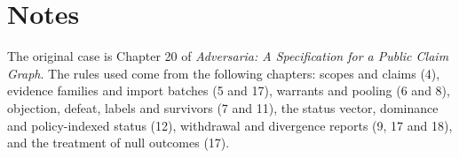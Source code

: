 \documentclass[11pt]{article}
\begin{document}
\section*{Notes}

The original case is Chapter 20 of \emph{Adversaria: A Specification for a Public Claim Graph}. The rules used come from the following chapters: scopes and claims (4), evidence families and import batches (5 and 17), warrants and pooling (6 and 8), objection, defeat, labels and survivors (7 and 11), the status vector, dominance and policy-indexed status (12), withdrawal and divergence reports (9, 17 and 18), and the treatment of null outcomes (17).
\end{document}
